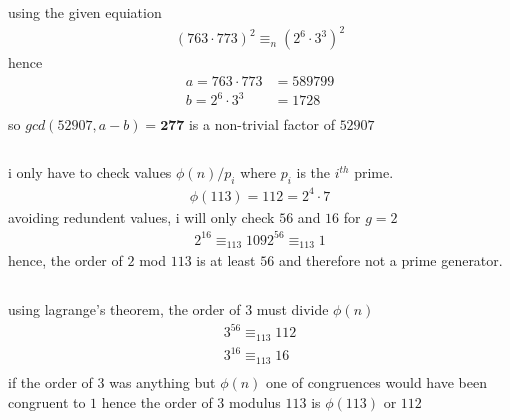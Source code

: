 \documentclass{article}
\begin{document}
\section{}
using the given equiation
\[
\begin{split}
(763\cdot 773)^{2} \equiv_{n} (2^{6}\cdot 3^{3})^{2}
\end{split}
\]
hence
\[
\begin{split}
a = 763\cdot 773 &= 589799 \\
b = 2^{6}\cdot 3^{3} &= 1728 \\
\end{split}
\]
so $gcd(52907, a - b) = \textbf{277}$ is a non-trivial factor of $52907$
\subsection{}
i only have to check values $\phi(n)/p_{i}$ where $p_{i}$ is the $i^{th}$ prime.
\[
\begin{split}
\phi(113) = 112 = 2^{4} \cdot 7
\end{split}
\]
avoiding redundent values, i will only check $56$ and $16$ for $g = 2$
\[
\begin{split}
2^{16} \equiv_{113} 109
2^{56} \equiv_{113} 1
\end{split}
\]
hence, the order of $2$ mod $113$ is at least $56$ and therefore not a prime generator.
\subsection{}
using lagrange's theorem, the order of 3 must divide $\phi(n)$
\[
\begin{split}
3^{56} \equiv_{113} 112 \\
3^{16} \equiv_{113} 16 \\
\end{split}
\]
if the order of $3$ was anything but $\phi(n)$ one of congruences would have been congruent to $1$
\newline
hence the order of $3$ modulus $113$ is $\phi(113)$ or $112$
\end{document}
